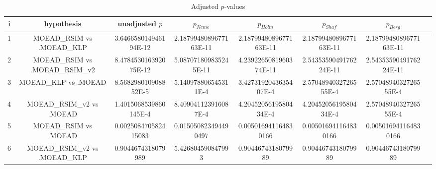 \documentclass[a4paper,10pt]{article}
\begin{document}
\begin{landscape}
\begin{table}[!htp]
\centering\tiny
\caption{Adjusted $p$-values}
\begin{tabular}{cccccccc}
i&hypothesis&unadjusted $p$&$p_{Neme}$&$p_{Holm}$&$p_{Shaf}$&$p_{Berg}$\\
\hline
1&MOEAD_RSIM vs .MOEAD_KLP&3.646658014946194E-12&2.1879948089677163E-11&2.1879948089677163E-11&2.1879948089677163E-11&2.1879948089677163E-11\\
2&MOEAD_RSIM vs .MOEAD_RSIM_v2&8.478453016392075E-12&5.087071809835245E-11&4.2392265081960374E-11&2.5435359049176224E-11&2.5435359049176224E-11\\
3&MOEAD_KLP vs .MOEAD&8.568298010908852E-5&5.140978806545311E-4&3.4273192043635407E-4&2.5704894032726555E-4&2.5704894032726555E-4\\
4&MOEAD_RSIM_v2 vs .MOEAD&1.4015068539860145E-4&8.409041123916087E-4&4.2045205619580434E-4&4.2045205619580434E-4&2.5704894032726555E-4\\
5&MOEAD_RSIM vs .MOEAD&0.002508470582415083&0.015050823494490497&0.005016941164830166&0.005016941164830166&0.005016941164830166\\
6&MOEAD_RSIM_v2 vs .MOEAD_KLP&0.9044674318079989&5.426804590847993&0.9044674318079989&0.9044674318079989&0.9044674318079989\\
\hline
\end{tabular}
\end{table}

\end{landscape}
\end{document}
